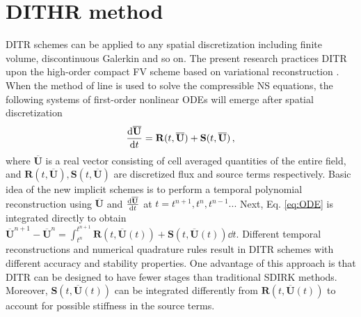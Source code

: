 \documentclass[10pt]{article}
\newcommand{\SRC}{\mathbf{S}}
\newcommand{\FF}{\mathbf{F}}
\newcommand{\uu}{\overline{\mathbf{U}}}
\newcommand{\R}{\mathbf{R}}
\begin{document}
\section{DITHR method}

DITR schemes can be applied to any spatial discretization including
finite volume, discontinuous Galerkin and so on.
The present research practices DITR upon the high-order compact FV
scheme based on variational reconstruction \cite{wang2017compact_VR}.
When the method of line is used to solve the compressible
NS equations,
the following systems of first-order nonlinear ODEs
will emerge after spatial discretization
\begin{equation}
  \label{eq:ODE}
  \dv{\uu}{t} = \R(t, \uu)+\SRC(t, \uu)\,,
\end{equation}
where $\uu$ is a real vector consisting of cell averaged quantities of
the entire field, and $\R(t, \uu),\SRC(t, \uu)$ are discretized flux and source terms respectively.
Basic idea of the new implicit schemes is to perform
a temporal polynomial reconstruction using $\uu$ and $\dv{\uu}{t}$
at $t=t^{n+1}, t^{n}, t^{n-1}...$ Next, Eq. \eqref{eq:ODE} is integrated
directly to obtain 
\(
  \uu^{n+1} - \uu^{n} = \int_{t^n}^{t^{n+1}}{\R(t,\uu(t))+\SRC(t,\uu(t))\dd{t}}
\).
Different temporal reconstructions and numerical quadrature rules
result in DITR schemes with different accuracy and stability properties.
One advantage of this approach is that DITR can be designed 
to have fewer stages than traditional SDIRK methods.
Moreover, $\SRC(t,\uu(t))$ can be
integrated differently from $\R(t,\uu(t))$ to account for possible 
stiffness in the source terms.
\end{document}
